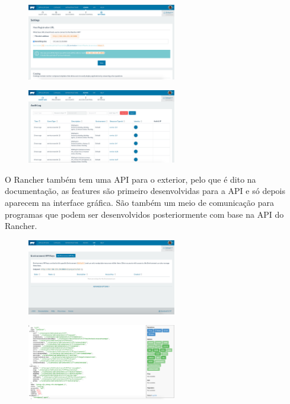 \documentclass[pdftex,12pt,a4paper]{report}
\begin{document}
\begin{figure}[!htb]
\centering
\begin{minipage}{.5\textwidth}
  \centering
  \includegraphics[width=65mm,scale=1]{imagens/settings.png}
  \label{fig:settings}
\end{minipage}%
\begin{minipage}{.5\textwidth}
  \centering
  \includegraphics[width=65mm,scale=1]{imagens/audit_log.png}
  \label{fig:audit_log}
\end{minipage}
\end{figure}

O Rancher também tem uma API para o exterior, pelo que é dito na documentação, as features são primeiro desenvolvidas para a API e só depois aparecem na interface gráfica. São também um meio de comunicação para programas que podem ser desenvolvidos posteriormente com base na API do Rancher.

\begin{figure}[!htb]
\centering
\begin{minipage}{.5\textwidth}
  \centering
  \includegraphics[width=65mm,scale=1]{imagens/api_panel.png}
  \label{fig:api_panel}
\end{minipage}%
\begin{minipage}{.5\textwidth}
  \centering
  \includegraphics[width=65mm,scale=1]{imagens/api_container.png}
  \label{fig:api_container}
\end{minipage}
\end{figure}
\end{document}
